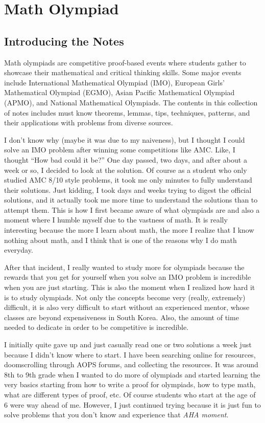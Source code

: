 \documentclass[../../main.tex]{subfiles}
\begin{document}
\part{Math Olympiad}\label{part:MATH01}
\localtableofcontents

\chapter*{Introducing the Notes}

Math olympiads are competitive proof-based events where students
gather to showcase their mathematical and critical thinking skills.
Some major events include International Mathematical Olympiad (IMO),
European Girls' Mathematical Olympiad (EGMO), Asian Pacific
Mathematical Olympiad (APMO), and National Mathematical Olympiads.
The contents in this collection of notes includes must know
theorems, lemmas, tips, techniques, patterns, and their applications
with problems from diverse sources.

I don't know why (maybe it was due to my naiveness), but I thought
I could solve an IMO problem after winning some competitions
like AMC. Like, I thought ``How bad could it be?'' One day passed,
two days, and after about a week or so, I decided to look at the
solution. Of course as a student who only studied AMC 8/10 style
problems, it took me only minutes to fully understand their solutions.
Just kidding, I took days and weeks trying to digest the official
solutions, and it actually took me more time to understand the
solutions than to attempt them. This is how I first became aware of
what olympiads are and also a moment where I humble myself due to
the vastness of math. It is really interesting because the more I
learn about math, the more I realize that I know nothing about math,
and I think that is one of the reasons why I do math everyday.

After that incident, I really wanted to study more for olympiads
because the rewards that you get for yourself when you solve an
IMO problem is incredible when you are just starting. This is also
the moment when I realized how hard it is to study olympiads.
Not only the concepts become very (really, extremely) difficult,
it is also very difficult to start without an experienced mentor,
whose classes are beyond expensiveness in South Korea. Also,
the amount of time needed to dedicate in order to be competitive
is incredible.

I initially quite gave up and just casually read one or two solutions
a week just because I didn't know where to start. I have been
searching online for resources, doomscrolling through AOPS forums,
and collecting the resources. It was around 8th to 9th grade when I
wanted to do more of olympiads and started learning the very basics
starting from how to write a proof for olympiads, how to type math,
what are different types of proof, etc. Of course students who start
at the age of 6 were way ahead of me. However, I just continued trying
because it is just fun to solve problems that you don't know and
experience that \textit{AHA moment}.
\end{document}
